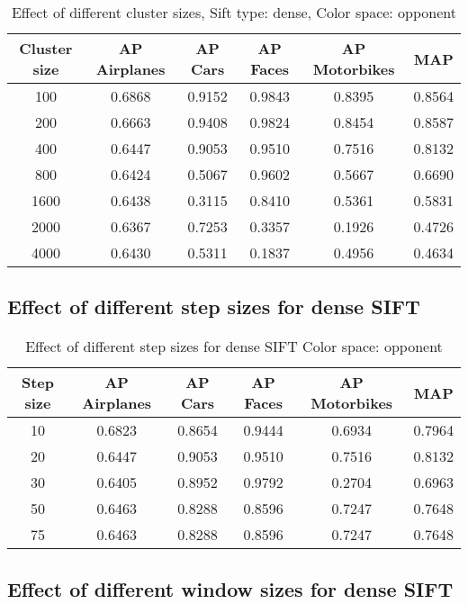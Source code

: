 \begin{table}[H]
\begin{tabular}{|c|ccccc|}
\hline
\textbf{Cluster size} & \textbf{AP Airplanes} & \textbf{AP Cars} & \textbf{AP Faces} & \textbf{AP Motorbikes} & \textbf{MAP}\\
\hline
100& 0.6868 & 0.9152 & 0.9843 & 0.8395 & 0.8564\\
200 & 0.6663 & 0.9408 & 0.9824 & 0.8454 & 0.8587\\
400 & 0.6447 & 0.9053 & 0.9510 & 0.7516 & 0.8132\\
800 & 0.6424 & 0.5067 & 0.9602 & 0.5667 & 0.6690\\
1600 & 0.6438 & 0.3115 & 0.8410 & 0.5361 & 0.5831\\
2000 & 0.6367 & 0.7253 & 0.3357 & 0.1926 & 0.4726\\
4000 & 0.6430 & 0.5311 & 0.1837 & 0.4956 & 0.4634\\
\hline
\end{tabular}
\caption{Effect of different cluster sizes, Sift type: dense, Color space: opponent}
\end{table}

\subsection{Effect of different step sizes for dense SIFT}

\begin{table}[H]
\begin{tabular}{|c|ccccc|}
\hline
\textbf{Step size} & \textbf{AP Airplanes} & \textbf{AP Cars} & \textbf{AP Faces} & \textbf{AP Motorbikes} & \textbf{MAP}\\
\hline
10 & 0.6823 & 0.8654 & 0.9444 & 0.6934 & 0.7964\\
20 & 0.6447 & 0.9053 & 0.9510 & 0.7516 & 0.8132\\
30 & 0.6405 &  0.8952& 0.9792& 0.2704 & 0.6963\\
50 & 0.6463 & 0.8288 & 0.8596 & 0.7247 & 0.7648\\
75 & 0.6463 & 0.8288 & 0.8596 & 0.7247 & 0.7648\\
\hline
\end{tabular}
\caption{Effect of different step sizes for dense SIFT Color space: opponent}
\end{table}



\subsection{Effect of different window sizes for dense SIFT}


